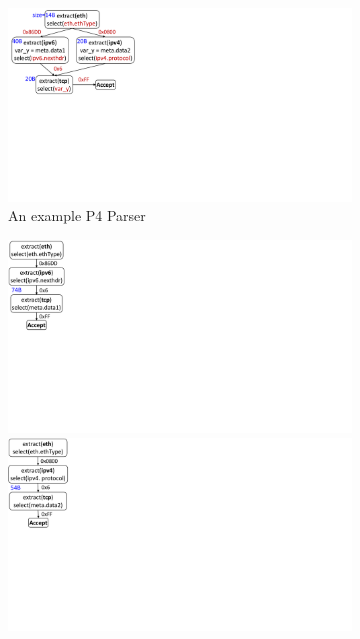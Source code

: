 \documentclass{hotnets19}
\begin{document}
\begin{figure}[!h]
    \begin{subfigure}[b]{0.25\linewidth}
        \centering
        \includegraphics[trim=4 270 596 0, clip,scale=0.37]{parser-transformation-example}
        \caption{An example P4 Parser}
        \label{subfig:parser}
    \end{subfigure}
    \begin{subfigure}[b]{0.28\linewidth}
        \centering
        \includegraphics[trim=0 285 790 0, clip,scale=0.37]{parser-example-se-1}
        \includegraphics[trim=0 285 790 0, clip,scale=0.37]{parser-example-se-2}

\end{subfigure}
\end{figure}
\end{document}
